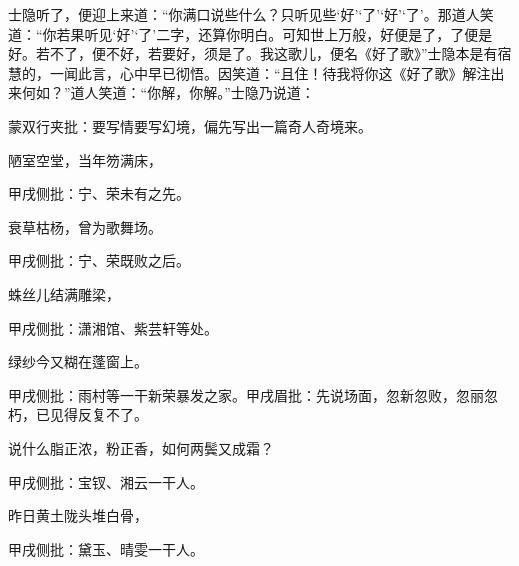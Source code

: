 \begin{parag}
    士隐听了，便迎上来道：“你满口说些什么？只听见些‘好’‘了’‘好’‘了’。那道人笑道：“你若果听见‘好’‘了’二字，还算你明白。可知世上万般，好便是了，了便是好。若不了，便不好，若要好，须是了。我这歌儿，便名《好了歌》”士隐本是有宿慧的，一闻此言，心中早已彻悟。因笑道：“且住！待我将你这《好了歌》解注出来何如？”道人笑道：“你解，你解。”士隐乃说道：\begin{note}蒙双行夹批：要写情要写幻境，偏先写出一篇奇人奇境来。\end{note}
\end{parag}


\begin{poem}

    \begin{pl}
        陋室空堂，当年笏满床，\end{pl}\begin{note}甲戌侧批：宁、荣未有之先。\end{note}

    \begin{pl}
        衰草枯杨，曾为歌舞场。\end{pl}\begin{note}甲戌侧批：宁、荣既败之后。\end{note}

    \begin{pl}
        蛛丝儿结满雕梁，\end{pl}\begin{note}甲戌侧批：潇湘馆、紫芸轩等处。\end{note}

    \begin{pl}
        绿纱今又糊在蓬窗上。\end{pl}\begin{note}甲戌侧批：雨村等一干新荣暴发之家。甲戌眉批：先说场面，忽新忽败，忽丽忽朽，已见得反复不了。\end{note}

    \begin{pl}
        说什么脂正浓，粉正香，如何两鬓又成霜？\end{pl}\begin{note}甲戌侧批：宝钗、湘云一干人。\end{note}

    \begin{pl}
        昨日黄土陇头堆白骨，\end{pl}\begin{note}甲戌侧批：黛玉、晴雯一干人。\end{note}


\end{poem}
